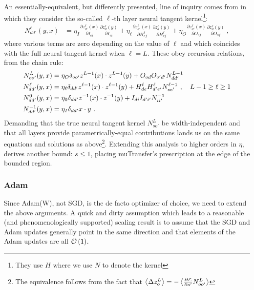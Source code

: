 An essentially-equivalent, but differently presented, line of inquiry comes from
\cite{yaida2022metaprincipledfamilyhyperparameterscaling} in which they consider the so-called $
\ell $-th layer neural tangent kernel\footnote{They use $ H $ where we use $ N $ to denote the
kernel}:
\begin{align}
    N^{ \ell }_{ dd' }(y, x) &= \eta_{ I } \frac{ \partial z ^{ \ell }_{ d' }(x) }{ \partial I_{ ei } }\frac{ \partial z^{ \ell }_{ d }(y) }{ \partial I_{ ei } }
    + \eta_{ \ell }\frac{ \partial z ^{ \ell }_{ d' }(x) }{ \partial H^{ \ell }_{ef} }\frac{ \partial z^{ \ell }_{ d }(y) }{ \partial H^{ \ell }_{ef} }
    + \eta_{ O }\frac{ \partial z ^{ \ell }_{ d' }(x) }{ \partial O_{ of } }\frac{ \partial z^{ \ell }_{ d }(y) }{ \partial O_{of} }\ ,
\end{align}
where various terms are zero depending on the value of $ \ell $ and which coincides with the full
neural tangent kernel when $ \ell=L $. These obey recursion relations, from the chain rule:
\begin{align}
    N^{ L }_{ oo' }(y, x)  &=\eta_{ O }\delta_{ oo' } z^{ L-1 }(x)\cdot z^{ L-1 }(y) + O_{ od }O_{ o'd' }N^{ L-1 }_{ dd' }\nonumber\\
    N^{ \ell }_{ dd' }(y, x)  &=\eta_{ \ell }\delta_{ dd' } z^{ \ell-1 }(x)\cdot z^{ \ell-1 }(y) + H^{ \ell }_{ de }H^{\ell }_{ d'e' }N^{ \ell-1 }_{ ee' } \ , \quad L-1 \ge \ell \ge 1\nonumber\\
    N^{0}_{ dd' }(y, x)  &=\eta_{0}\delta_{ dd' } z^{ -1 }(x)\cdot z^{ -1 }(y) + I_{ di }I_{ d'i' } N^{ -1 }_{ ii' }\nonumber\\
    N^{ -1 }_{ dd' }(y, x)&=\eta_{ I }\delta_{ dd'} x\cdot y \ .
\end{align}
Demanding that the true neural tangent kernel $ N^{ L }_{ oo' } $ be width-independent and that all
layers provide parametrically-equal contributions lands us on the same equations and solutions as
above\footnote{The equivalence follows from the fact that $ \left\langle \Delta z^{ L }_{ o }
\right\rangle = -  \left\langle \frac{ \partial \mathcal{L}  }{ \partial o' } N^{ L }_{ oo' }
\right\rangle  $}. Extending this analysis to higher orders in $ \eta $,
\cite{yaida2022metaprincipledfamilyhyperparameterscaling} derives another bound: $ s\le 1 $, placing
muTransfer's prescription at the edge of the bounded region.

\subsubsection{Adam}

Since Adam(W), not SGD, is the de facto optimizer of choice, we need to extend the above arguments.
A quick and dirty assumption which leads to a reasonable (and phenomenologically supported) scaling
result is to assume that the SGD and Adam updates generally point in the same direction and that
elements of the Adam updates are all $ \mathcal{O} \left( 1 \right)  $.

